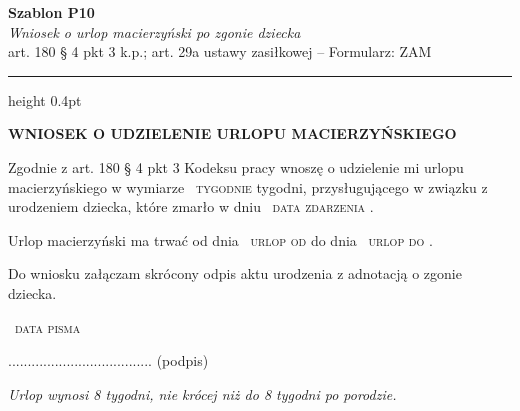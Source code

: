 \documentclass[11pt,a4paper]{article}
\newcommand{\Pole}[1]{%
  \textcolor{szary}{\dotfill}\,%
  {\scriptsize\textcolor{szary}{\textsc{#1}}}%
}
\newcommand{\NaglowekPisma}[1]{%
  \par\vspace{0.8em}%
  \begin{center}%
    {\large\bfseries\MakeUppercase{#1}}%
  \end{center}%
  \vspace{0.4em}%
}
\begin{document}
\begin{flushright}
{\footnotesize\color{szary}
\textbf{Szablon P10}\\
{\itshape Wniosek o urlop macierzyński po zgonie dziecka}\\
art. 180 \S{} 4 pkt 3 k.p.; art. 29a ustawy zasiłkowej -- Formularz: ZAM}\
\end{flushright}

\vspace{0.5em}
{\color{ramka}\hrule height 0.4pt}
\vspace{0.8em}

\NaglowekPisma{WNIOSEK O UDZIELENIE URLOPU MACIERZYŃSKIEGO}

Zgodnie z art. 180 \S{} 4 pkt 3 Kodeksu pracy wnoszę o udzielenie mi urlopu
macierzyńskiego w wymiarze \Pole{tygodnie} tygodni, przysługującego w związku
z urodzeniem dziecka, które zmarło w dniu \Pole{data zdarzenia}.

Urlop macierzyński ma trwać od dnia \Pole{urlop od} do dnia \Pole{urlop do}.

Do wniosku załączam skrócony odpis aktu urodzenia z adnotacją o zgonie dziecka.

\Pole{data pisma}
.....................................
(podpis)

\vfill
{\footnotesize\textcolor{szary}\itshape Urlop wynosi 8 tygodni, nie krócej niż do 8 tygodni po porodzie.}
\end{document}

